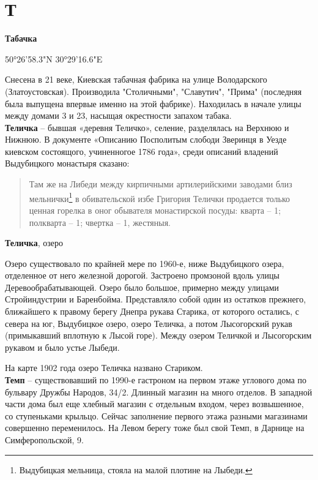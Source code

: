 \chapter*{Т}

\textbf{Табачка}

50°26'58.3"N 30°29'16.6"E

Снесена в 21 веке, Киевская табачная фабрика на улице Володарского (Златоустовская). Производила  "Столичными", "Славутич", "Прима" (последняя была выпущена впервые именно на этой фабрике). Находилась в начале улицы между домами 3 и 23, насыщая окрестности запахом табака.\\

\textbf{Теличка} – бывшая «деревня Теличко», селение, разделялась на Верхнюю и Нижнюю. В документе «Описанию Посполитым слободи Зверинця в Уезде киевском состоящого, учиненногое 1786 года», среди описаний владений Выдубицкого монастыря сказано:

\begin{quotation}
Там же на Либеди между кирпичными артилерийскими заводами близ мельнички\footnote{Выдубицкая мельница, стояла на малой плотине на Лыбеди.} в обивательской избе Григория Телички продается только ценная горелка в оног обывателя монастирской посуды: кварта – 1; полкварта – 1; чвертка – 1, жестяныя.\end{quotation}

\textbf{Теличка}, озеро

Озеро существовало по крайней мере по 1960-е, ниже Выдубицкого озера, отделенное от него железной дорогой. Застроено промзоной вдоль улицы Деревообрабатывающей. Озеро было большое, примерно между улицами Стройиндустрии и Баренбойма. Представляло собой один из остатков прежнего, ближайшего к правому берегу Днепра рукава Старика, от которого остались, с севера на юг, Выдубицкое озеро, озеро Теличка, а потом Лысогорский рукав (примыкавший вплотную к Лысой горе). Между озером Теличкой и Лысогорским рукавом и было устье Лыбеди.

На карте 1902 года озеро Теличка названо Стариком.\\

\textbf{Темп} – существовавший по 1990-е гастроном на первом этаже углового дома по бульвару Дружбы Народов, 34/2. Длинный магазин на много отделов. В западной части дома был еще хлебный магазин с отдельным входом, через возвышенное, со ступеньками крыльцо. Сейчас заполнение первого этажа разными магазинами совершенно переменилось. На Левом берегу тоже был свой Темп, в Дарнице на Симферопольской, 9.\\

